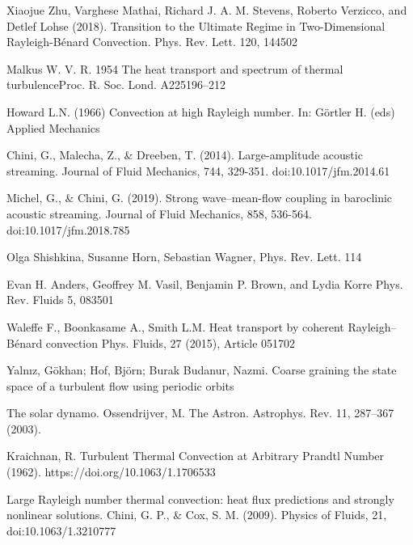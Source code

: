 \documentclass[reprint,amsmath,amssymb,aps]{revtex4-1}
\begin{document}
\begin{thebibliography}{99} 

 Xiaojue Zhu, Varghese Mathai, Richard J. A. M. Stevens, Roberto Verzicco, and Detlef Lohse (2018). Transition to the Ultimate Regime in Two-Dimensional Rayleigh-Bénard Convection. Phys. Rev. Lett. 120, 144502

 Malkus W. V. R. 1954 The heat transport and spectrum of thermal turbulenceProc. R. Soc. Lond. A225196–212

 Howard L.N. (1966) Convection at high Rayleigh number. In: Görtler H. (eds) Applied Mechanics

 Chini, G., Malecha, Z., \& Dreeben, T. (2014). Large-amplitude acoustic streaming. Journal of Fluid Mechanics, 744, 329-351. doi:10.1017/jfm.2014.61

 Michel, G., \& Chini, G. (2019). Strong wave–mean-flow coupling in baroclinic acoustic streaming. Journal of Fluid Mechanics, 858, 536-564. doi:10.1017/jfm.2018.785

 Olga Shishkina, Susanne Horn, Sebastian Wagner, Phys. Rev. Lett. 114

 Evan H. Anders, Geoffrey M. Vasil, Benjamin P. Brown, and Lydia Korre Phys. Rev. Fluids 5, 083501

 Waleffe F., Boonkasame A., Smith L.M. Heat transport by coherent Rayleigh–Bénard convection Phys. Fluids, 27 (2015), Article 051702

 Yalnız, Gökhan; Hof, Björn; Burak Budanur, Nazmi. Coarse graining the state space of a turbulent flow using periodic orbits 

 The solar dynamo. Ossendrijver, M. The Astron. Astrophys. Rev. 11, 287–367 (2003).

 Kraichnan, R. Turbulent Thermal Convection at Arbitrary Prandtl Number (1962). https://doi.org/10.1063/1.1706533



 Large Rayleigh number thermal convection: heat flux predictions and strongly nonlinear solutions. Chini, G. P., \& Cox, S. M. (2009). Physics of Fluids, 21, doi:10.1063/1.3210777


\end{thebibliography}
\end{document}

